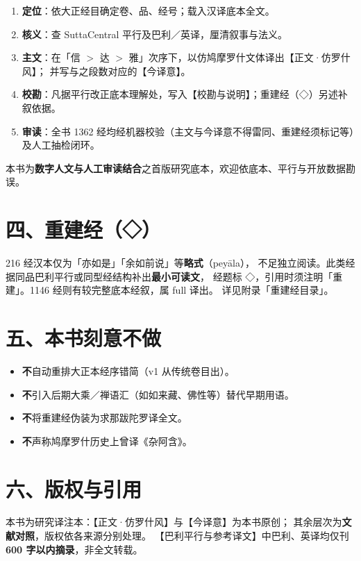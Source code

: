 \begin{enumerate}[label=\textbf{\arabic*.}]
  \item \textbf{定位}：依大正经目确定卷、品、经号；载入汉译底本全文。
  \item \textbf{核义}：查 SuttaCentral 平行及巴利／英译，厘清叙事与法义。
  \item \textbf{主文}：在「信 $>$ 达 $>$ 雅」次序下，以仿鸠摩罗什文体译出【正文·仿罗什风】；
  并写与之段数对应的【今译意】。
  \item \textbf{校勘}：凡据平行改正底本理解处，写入【校勘与说明】；重建经（◇）另述补叙依据。
  \item \textbf{审读}：全书 1362 经均经机器校验（主文与今译意不得雷同、重建经须标记等）及人工抽检闭环。
\end{enumerate}

\noindent 本书为\textbf{数字人文与人工审读结合}之首版研究底本，欢迎依底本、平行与开放数据勘误。

\section*{四、重建经（◇）}

216 经汉本仅为「亦如是」「余如前说」等\textbf{略式}（peyāla），
不足独立阅读。此类经据同品巴利平行或同型经结构补出\textbf{最小可读文}，
经题标 ◇，引用时须注明「重建」。1146 经则有较完整底本经叙，属 full 译出。
详见附录「重建经目录」。

\section*{五、本书刻意不做}

\begin{itemize}
  \item \textbf{不}自动重排大正本经序错简（v1 从传统卷目出）。
  \item \textbf{不}引入后期大乘／禅语汇（如如来藏、佛性等）替代早期用语。
  \item \textbf{不}将重建经伪装为求那跋陀罗译全文。
  \item \textbf{不}声称鸠摩罗什历史上曾译《杂阿含》。
\end{itemize}

\section*{六、版权与引用}

本书为研究译注本：【正文·仿罗什风】与【今译意】为本书原创；
其余层次为\textbf{文献对照}，版权依各来源分别处理。
【巴利平行与参考译文】中巴利、英译均仅刊\textbf{600 字以内摘录}，非全文转载。

